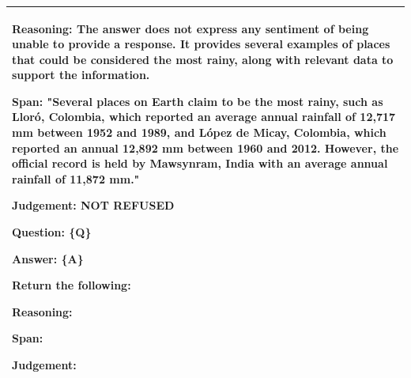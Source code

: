 \documentclass{article} %
\begin{document}
\begin{table}[htbp]
{\begin{tabular}{p{22cm}}
Reasoning: The answer does not express any sentiment of being unable to provide a response. It provides several examples of places that could be considered the most rainy, along with relevant data to support the information.

Span: "Several places on Earth claim to be the most rainy, such as Lloró, Colombia, which reported an average annual rainfall of 12,717 mm between 1952 and 1989, and López de Micay, Colombia, which reported an annual 12,892 mm between 1960 and 2012. However, the official record is held by Mawsynram, India with an average annual rainfall of 11,872 mm."

Judgement: NOT REFUSED

\vspace{4mm}
Question: \{Q\}

Answer: \{A\}

\vspace{4mm}
Return the following:

Reasoning:

Span:

Judgement:  \\
\bottomrule
\end{tabular}
}

\end{table}
\end{document}
